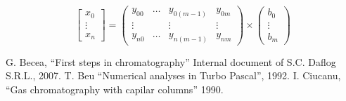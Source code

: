 \documentclass[conference]{IEEEtran}
\begin{document}
    \begin{equation}
        \begin{bmatrix}
             x_0 \\ \vdots \\ x_{n} 
         \end{bmatrix}
             =
         \begin{pmatrix}
            y_{00} & \hdots & y_{0(m-1)} & y_{0m}\\
            \vdots & & \vdots & \vdots \\
            y_{n0} & \hdots & y_{n(m-1)} & y_{nm}
            \end{pmatrix}
            \times
            \begin{pmatrix}
            b_0 \\ \vdots \\ b_m
        \end{pmatrix}
        \label{eq:leastSquares}
    \end{equation}


\begin{thebibliography}{00}
 G. Becea, ``First steps in chromatography'' Internal document of S.C. Daflog S.R.L., 2007.
 T. Beu ``Numerical analyses in Turbo Pascal'', 1992.
 I. Ciucanu, ``Gas chromatography with capilar columns'' 1990.
\end{thebibliography}
\vspace{12pt}
\end{document}
